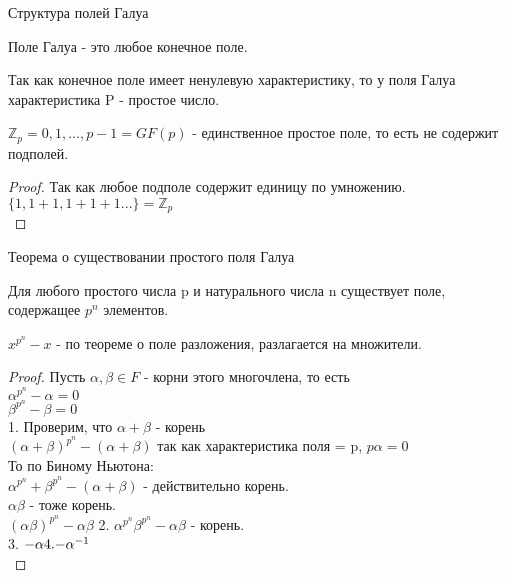 \begin{title}
  {Структура полей Галуа}
\end{title}

\begin{define}
  Поле Галуа - это любое конечное поле.
\end{define}

Так как конечное поле имеет ненулевую характеристику, то у поля Галуа
характеристика P - простое число.\\

\begin{theorem}
  $\mathbb{Z}_{p} = {0, 1,..., p - 1} = GF(p)$  - единственное простое поле,
  то есть не содержит подполей.\\
\end{theorem}

\begin{proof}
  Так как любое подполе содержит единицу по умножению.\\
  $\{1, 1+1, 1+1+1...\} = \mathbb{Z}_{p}$\\
\end{proof}

\begin{title}
  Теорема о существовании простого поля Галуа
\end{title}

\begin{theorem}
  Для любого простого числа p и натурального числа n существует поле, содержащее
$p^{n}$ элементов.
\end{theorem}

$x^{p^n} - x$ - по теореме о поле разложения, разлагается на множители.\\

\begin{proof}
Пусть $\alpha, \beta \in F$ - корни этого многочлена, то есть\\
$\alpha^{p^n} - \alpha = 0$\\
$\beta^{p^n} - \beta = 0$\\
1. Проверим, что $\alpha + \beta$ - корень\\
${(\alpha + \beta)}^{p^n} - (\alpha + \beta)$ так как характеристика
поля = p, $p\alpha = 0$\\
То по Биному Ньютона:\\
$\alpha^{p^n} + \beta^{p^n} - (\alpha + \beta)$ - действительно корень.\\
$\alpha\beta$ - тоже корень.\\
${(\alpha\beta)}^{p^n} - \alpha\beta$
2. ${\alpha}^{p^n}{\beta}^{p^n} - \alpha\beta$ - корень.\\
3. $-\alpha\\
4. {-\alpha}^{-1}$\\
\end{proof}

